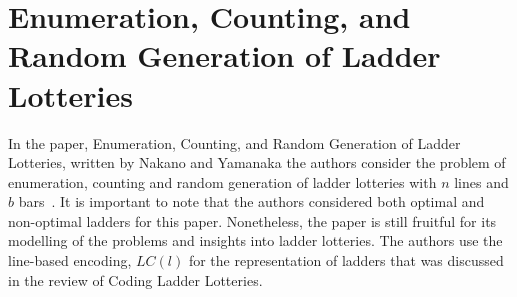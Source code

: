 \section{Enumeration, Counting, and Random Generation of \newline Ladder Lotteries}

In the paper, Enumeration, Counting, and Random Generation of Ladder Lotteries, written by Nakano and Yamanaka 
the authors consider the problem of enumeration, counting and 
random generation of ladder lotteries with $n$ lines and $b$ bars~\cite{A6}. 
It is important to note that the authors considered both optimal and 
non-optimal ladders for this paper. Nonetheless, the paper is still fruitful 
for its modelling of the problems and insights into ladder lotteries.
The authors use  the line-based encoding, $LC(l)$ for the representation of ladders 
that was discussed in the review of Coding Ladder Lotteries.

